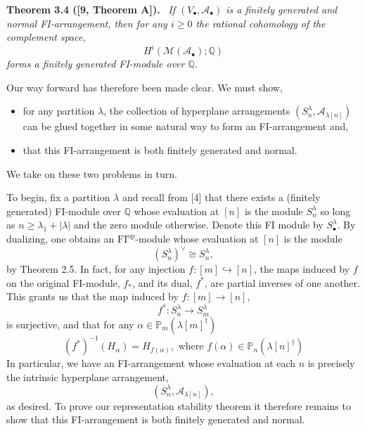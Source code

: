 \documentclass[10pt,a4paper]{article}
\newenvironment{sourceblock}[1]{\par\medskip\noindent\textbf{#1.}\ \itshape}{\par\medskip}
\begin{document}
\begin{sourceblock}{Theorem 3.4 ([9, Theorem A])}
If $(V_\bullet,\mathcal{A}_\bullet)$ is a finitely generated and normal FI-arrangement, then for any $i\geq0$ the rational cohomology of the complement space,
\[
 H^i(\mathcal{M}(\mathcal{A}_\bullet);\mathbb{Q})
\]
forms a finitely generated FI-module over $\mathbb{Q}$.
\end{sourceblock}

Our way forward has therefore been made clear. We must show,
\begin{itemize}
\item for any partition $\lambda$, the collection of hyperplane arrangements $(S_n^\lambda,\mathcal{A}_{\lambda[n]})$ can be glued together in some natural way to form an FI-arrangement and,
\item that this FI-arrangement is both finitely generated and normal.
\end{itemize}
We take on these two problems in turn.

To begin, fix a partition $\lambda$ and recall from [4] that there exists a (finitely generated) FI-module over $\mathbb{Q}$ whose evaluation at $[n]$ is the module $S_n^\lambda$ so long as $n\geq\lambda_1+|\lambda|$ and the zero module otherwise. Denote this FI module by $S_\bullet^\lambda$. By dualizing, one obtains an $\mathrm{FI}^{\mathrm{op}}$-module whose evaluation at $[n]$ is the module
\[
 (S_n^\lambda)^\vee\cong S_n^\lambda,
\]
by Theorem 2.5. In fact, for any injection $f:[m]\hookrightarrow[n]$, the maps induced by $f$ on the original FI-module, $f_*$, and its dual, $f^*$, are partial inverses of one another. This grants us that the map induced by $f:[m]\to[n]$,
\[
 f^*:S_n^\lambda\to S_m^\lambda
\]
is surjective, and that for any $\alpha\in\mathbb{P}_m(\lambda[m]^\dagger)$
\[
 (f^*)^{-1}(H_\alpha)=H_{f(\alpha)},\text{ where }f(\alpha)\in\mathbb{P}_n(\lambda[n]^\dagger)
\]
In particular, we have an FI-arrangement whose evaluation at each $n$ is precisely the intrinsic hyperplane arrangement,
\[
 (S_n^\lambda,\mathcal{A}_{\lambda[n]}),
\]
as desired. To prove our representation stability theorem it therefore remains to show that this FI-arrangement is both finitely generated and normal.
\end{document}

